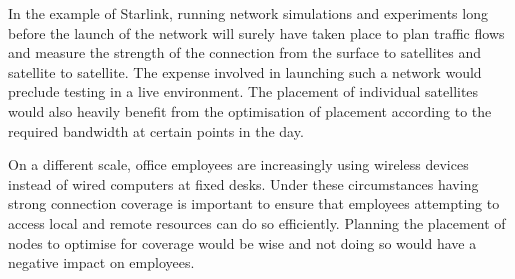 		In the example of Starlink, running network simulations and experiments long before the launch of the network will surely have taken place to plan traffic flows and measure the strength of the connection from the surface to satellites and satellite to satellite. The expense involved in launching such a network would preclude testing in a live environment. The placement of individual satellites would also heavily benefit from the optimisation of placement according to the required bandwidth at certain points in the day.

		On a different scale, office employees are increasingly using wireless devices instead of wired computers at fixed desks. Under these circumstances having strong connection coverage is important to ensure that employees attempting to access local and remote resources can do so efficiently. Planning the placement of nodes to optimise for coverage would be wise and not doing so would have a negative impact on employees.
